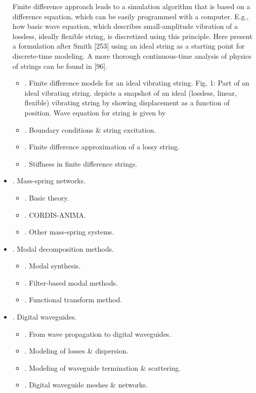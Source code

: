 \documentclass{article}
\begin{document}
\begin{itemize}
	Finite difference approach leads to a simulation algorithm that is based on a difference equation, which can be easily programmed with a computer. E.g., how basic wave equation, which describes small-amplitude vibration of a lossless, ideally flexible string, is discretized using this principle. Here present a formulation after Smith [253] using an ideal string as a starting point for discrete-time modeling. A more thorough continuous-time analysis of physics of strings can be found in [96].
	\begin{itemize}
		\item {. Finite difference models for an ideal vibrating string.} {\sf Fig. 1: Part of an ideal vibrating string.} depicts a snapshot of an ideal (lossless, linear, flexible) vibrating string by showing displacement as a function of position. Wave equation for string is given by 
		\item {. Boundary conditions \& string excitation.}
		\item {. Finite difference approximation of a lossy string.}
		\item {. Stiffness in finite difference strings.}
	\end{itemize}
	\item {. Mass-spring networks.}
	\begin{itemize}
		\item {. Basic theory.}
		\item {. CORDIS-ANIMA.}
		\item {. Other mass-spring systems.}
	\end{itemize}
	\item {. Modal decomposition methods.}
	\begin{itemize}
		\item {. Modal synthesis.}
		\item {. Filter-based modal methods.}
		\item {. Functional transform method.}
	\end{itemize}
	\item {. Digital waveguides.}
	\begin{itemize}
		\item {. From wave propagation to digital waveguides.}
		\item {. Modeling of losses \& dispersion.}
		\item {. Modeling of waveguide termination \& scattering.}
		\item {. Digital waveguide meshes \& networks.}

\end{itemize}
\end{itemize}
\end{document}
